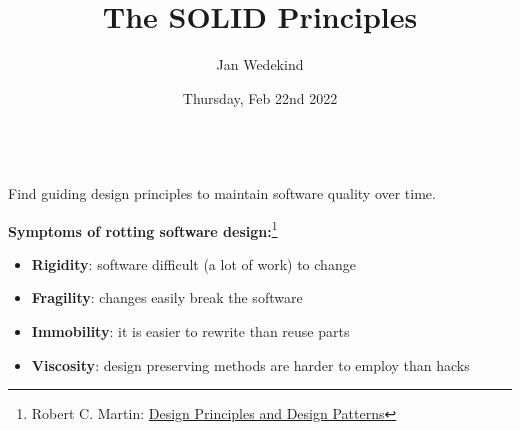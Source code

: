 \documentclass[calcdimensions,landscape,letterpaper]{powersem}
\title{The SOLID Principles}
\author{Jan Wedekind}
\date{Thursday, Feb 22nd 2022}
\newcommand{\thecurrentheading}{}
\newcommand{\heading}[1]{\renewcommand{\thecurrentheading}{#1}}
\begin{document}
\begin{slide}
  \heading{\ }
  \begin{center}
    \maketitle
  \end{center}
\end{slide}

\begin{slide}
  \heading{Motivation}
  \begin{center}
    \begin{minipage}[c]{.5\textwidth}
      \begin{center}
        \bigskip\\
        Find guiding design principles to maintain software quality over time.
      \end{center}
    \end{minipage}
  \end{center}
\end{slide}

\begin{slide}
  \heading{Software Rot}
  \begin{center}
    \textbf{Symptoms of rotting software design:}\footnote{Robert C. Martin: \href{https://staff.cs.utu.fi/~jounsmed/doos_06/material/DesignPrinciplesAndPatterns.pdf}{Design Principles and Design Patterns}}
    \begin{itemize}
      \item \textbf{Rigidity}: software difficult (a lot of work) to change
      \item \textbf{Fragility}: changes easily break the software
      \item \textbf{Immobility}: it is easier to rewrite than reuse parts
      \item \textbf{Viscosity}: design preserving methods are harder to employ than hacks
    \end{itemize}
  \end{center}
\end{slide}
\end{document}

